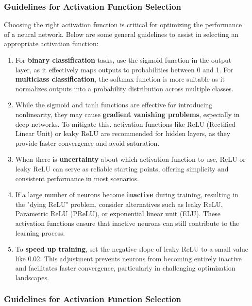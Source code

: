 \subsubsection{Guidelines for Activation Function Selection}

Choosing the right activation function is critical for optimizing the performance of a neural network. Below are some general guidelines to assist in selecting an appropriate activation function:

\begin{enumerate}
	\item For \textbf{binary classification} tasks, use the sigmoid function in the output layer, as it effectively maps outputs to probabilities between 0 and 1. For \textbf{multiclass classification}, the softmax function is more suitable as it normalizes outputs into a probability distribution across multiple classes.
	
	\item While the sigmoid and tanh functions are effective for introducing nonlinearity, they may cause \textbf{gradient vanishing problems}, especially in deep networks. To mitigate this, activation functions like ReLU (Rectified Linear Unit) or leaky ReLU are recommended for hidden layers, as they provide faster convergence and avoid saturation.
	
	\item When there is \textbf{uncertainty} about which activation function to use, ReLU or leaky ReLU can serve as reliable starting points, offering simplicity and consistent performance in most scenarios.
	
	\item If a large number of neurons become \textbf{inactive} during training, resulting in the "dying ReLU" problem, consider alternatives such as leaky ReLU, Parametric ReLU (PReLU), or exponential linear unit (ELU). These activation functions ensure that inactive neurons can still contribute to the learning process.
	
	\item To \textbf{speed up training}, set the negative slope of leaky ReLU to a small value like 0.02. This adjustment prevents neurons from becoming entirely inactive and facilitates faster convergence, particularly in challenging optimization landscapes.
\end{enumerate}

\subsubsection{Guidelines for Activation Function Selection}

